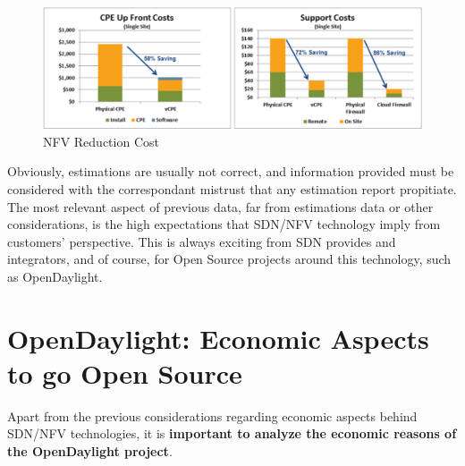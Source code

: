 \documentclass[a4paper, 12pt]{book}
\begin{document}
\begin{center}
 \begin{figure}[H]
 \begin{center}
   \includegraphics[width=15cm]{img/nfv-cost-savings-00.png}
   \caption{NFV Reduction Cost}
   \label{fig:sdnopexreduction}
 \end{center}
 \end{figure}
\end{center}
Obviously, estimations are usually not correct, and information provided must be considered with the correspondant mistrust that any estimation report propitiate. The most relevant aspect of previous data, far from estimations data or other considerations, is the high expectations that SDN/NFV technology imply from customers' perspective. This is always exciting from SDN provides and integrators, and of course, for Open Source projects around this technology, such as OpenDaylight.

\section{OpenDaylight: Economic Aspects to go Open Source}
\label{sec:odlopensource}
Apart from the previous considerations regarding economic aspects behind SDN/NFV technologies, it is \textbf{important to analyze the economic reasons of the OpenDaylight project}.
\end{document}
